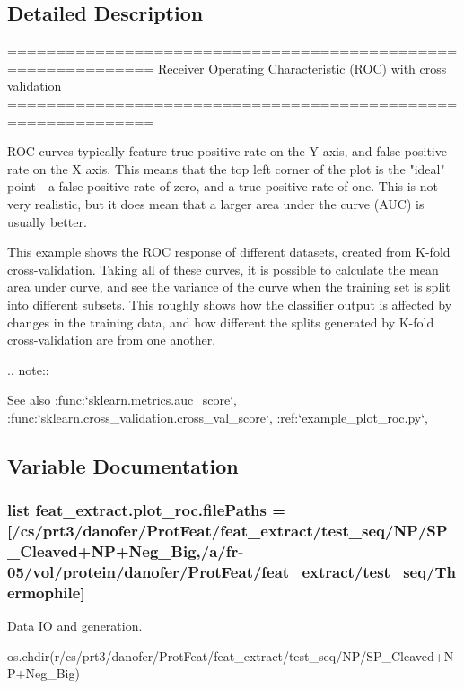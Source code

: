 \subsection{Detailed Description}
\begin{DoxyVerb}=============================================================
Receiver Operating Characteristic (ROC) with cross validation
=============================================================


ROC curves typically feature true positive rate on the Y axis, and false
positive rate on the X axis. This means that the top left corner of the plot is
the "ideal" point - a false positive rate of zero, and a true positive rate of
one. This is not very realistic, but it does mean that a larger area under the
curve (AUC) is usually better.

This example shows the ROC response of different datasets, created from K-fold
cross-validation. Taking all of these curves, it is possible to calculate the
mean area under curve, and see the variance of the curve when the
training set is split into different subsets. This roughly shows how the
classifier output is affected by changes in the training data, and how
different the splits generated by K-fold cross-validation are from one another.

.. note::

    See also :func:`sklearn.metrics.auc_score`,
     :func:`sklearn.cross_validation.cross_val_score`,
     :ref:`example_plot_roc.py`,\end{DoxyVerb}
 

\subsection{Variable Documentation}
\hypertarget{namespacefeat__extract_1_1plot__roc_a1e739bbf71d2ec8c6fd3045e50b87ab7}{}
\subsubsection[{file\+Paths}]{\setlength{\rightskip}{0pt plus 5cm}list feat\+\_\+extract.\+plot\+\_\+roc.\+file\+Paths = \mbox{[}\textquotesingle{}/cs/prt3/danofer/Prot\+Feat/feat\+\_\+extract/test\+\_\+seq/N\+P/S\+P\+\_\+\+Cleaved+N\+P+Neg\+\_\+\+Big\textquotesingle{},\textquotesingle{}/a/fr-\/05/vol/protein/danofer/Prot\+Feat/feat\+\_\+extract/test\+\_\+seq/Thermophile\textquotesingle{}\mbox{]}}\label{namespacefeat__extract_1_1plot__roc_a1e739bbf71d2ec8c6fd3045e50b87ab7}


Data I\+O and generation. 

os.\+chdir(r\textquotesingle{}/cs/prt3/danofer/\+Prot\+Feat/feat\+\_\+extract/test\+\_\+seq/\+N\+P/\+S\+P\+\_\+\+Cleaved+\+N\+P+\+Neg\+\_\+\+Big\textquotesingle{}) 